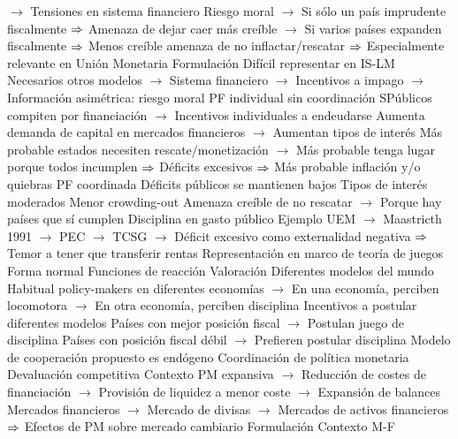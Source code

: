 \documentclass{nuevotema}
\begin{document}
\begin{esquemal}
				\4[] $\to$ Tensiones en sistema financiero
				\4[] Riesgo moral
				\4[] $\to$ Si sólo un país imprudente fiscalmente
				\4[] $\then$ Amenaza de dejar caer más creíble
				\4[] $\to$ Si varios países expanden fiscalmente
				\4[] $\then$ Menos creíble amenaza de no inflactar/rescatar
				\4[] $\then$ Especialmente relevante en Unión Monetaria
				\4 Formulación
				\4[] Difícil representar en IS-LM
				\4[] Necesarios otros modelos
				\4[] $\to$ Sistema financiero
				\4[] $\to$ Incentivos a impago
				\4[] $\to$ Información asimétrica: riesgo moral
				\4 PF individual sin coordinación
				\4[] SPúblicos compiten por financiación
				\4[] $\to$ Incentivos individuales a endeudarse
				\4[] Aumenta demanda de capital en mercados financieros
				\4[] $\to$ Aumentan tipos de interés
				\4[] Más probable estados necesiten rescate/monetización
				\4[] $\to$ Más probable tenga lugar porque todos incumplen
				\4[] $\then$ Déficits excesivos
				\4[] $\then$ Más probable inflación y/o quiebras
				\4 PF coordinada
				\4[] Déficits públicos se mantienen bajos
				\4[] Tipos de interés moderados
				\4[] Menor crowding-out
				\4[] Amenaza creíble de no rescatar
				\4[] $\to$ Porque hay países que sí cumplen
				\4[] Disciplina en gasto público
				\4 Ejemplo
				\4[] UEM
				\4[] $\to$ Maastricth 1991
				\4[] $\to$ PEC
				\4[] $\to$ TCSG
				\4[] $\to$ Déficit excesivo como externalidad negativa
				\4[] $\then$ Temor a tener que transferir rentas
				\4 Representación en marco de teoría de juegos
				\4[] Forma normal
				\4[] 
				\4[] Funciones de reacción
				\4[] 
			\3 Valoración
				\4 Diferentes modelos del mundo
				\4[] Habitual policy-makers en diferentes economías
				\4[] $\to$ En una economía, perciben locomotora
				\4[] $\to$ En otra economía, perciben disciplina
				\4 Incentivos a postular diferentes modelos
				\4[] Países con mejor posición fiscal
				\4[] $\to$ Postulan juego de disciplina
				\4[] Países con posición fiscal débil
				\4[] $\to$ Prefieren postular disciplina
				\4[$\then$] Modelo de cooperación propuesto es endógeno
		\2 Coordinación de política monetaria
			\3 Devaluación competitiva
				\4 Contexto
				\4[] PM expansiva
				\4[] $\to$ Reducción de costes de financiación
				\4[] $\to$ Provisión de liquidez a menor coste
				\4[] $\to$ Expansión de balances
				\4[] Mercados financieros
				\4[] $\to$ Mercado de divisas
				\4[] $\to$ Mercados de activos financieros
				\4[] $\then$ Efectos de PM sobre mercado cambiario
				\4 Formulación
				\4[] Contexto M-F

\end{esquemal}
\end{document}
